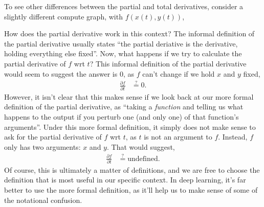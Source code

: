 \documentclass{article}
\newcommand{\dd}[2][]{\frac{\partial #1}{\partial #2}}
\begin{document}
To see other differences between the partial and total derivatives, consider a slightly different compute graph, with $f(x(t), y(t))$,
\begin{center}
\end{center}
How does the partial derivative work in this context?
The informal definition of the partial derivative usually states ``the partial deriative is the derivative, holding everything else fixed''.
Now, what happens if we try to calculate the partial derivative of $f$ wrt $t$?
This informal definition of the partial derivative would seem to suggest the answer is $0$, as $f$ can't change if we hold $x$ and $y$ fixed,
\begin{align}
  \dd[f]{t} &\stackrel{?}{=} 0.
\end{align}
However, it isn't clear that this makes sense if we look back at our more formal definition of the partial derivative, as ``taking a \textit{function} and telling us what happens to the output if you perturb one (and only one) of that function's arguments''.
Under this more formal definition, it simply does not make sense to ask for the partial derivative of $f$ wrt $t$, as $t$ is not an argument to $f$.  
Instead, $f$ only has two arguments: $x$ and $y$.  
That would suggest,
\begin{align}
  \dd[f]{t} &\stackrel{?}{=} \text{undefined}.
\end{align}
Of course, this is ultimately a matter of definitions, and we are free to choose the definition that is most useful in our specific context.
In deep learning, it's far better to use the more formal definition, as it'll help us to make sense of some of the notational confusion.
\end{document}
